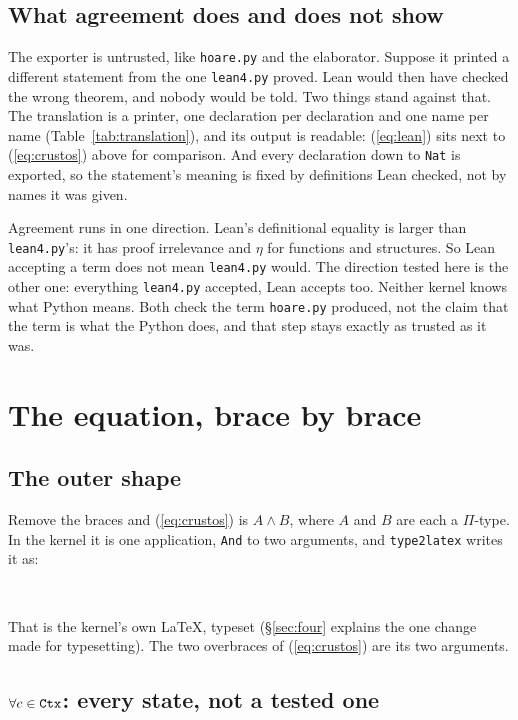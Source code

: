 \documentclass[11pt]{article}
\newcommand{\code}[1]{\texttt{#1}}
\begin{document}
\subsection{What agreement does and does not show}
\label{sec:agreement}

The exporter is untrusted, like \code{hoare.py} and the elaborator. Suppose
it printed a different statement from the one \code{lean4.py} proved. Lean
would then have checked the wrong theorem, and nobody would be told. Two
things stand against that. The translation is a printer, one declaration per
declaration and one name per name (Table~\ref{tab:translation}), and its
output is readable: (\ref{eq:lean}) sits next to (\ref{eq:crustos}) above for
comparison. And every declaration down to \code{Nat} is exported, so the
statement's meaning is fixed by definitions Lean checked, not by names it was
given.

Agreement runs in one direction. Lean's definitional equality is larger than
\code{lean4.py}'s: it has proof irrelevance and $\eta$ for functions and
structures. So Lean accepting a term does not mean \code{lean4.py} would. The
direction tested here is the other one: everything \code{lean4.py} accepted,
Lean accepts too. Neither kernel knows what Python means. Both check the term
\code{hoare.py} produced, not the claim that the term is what the Python does,
and that step stays exactly as trusted as it was.

\section{The equation, brace by brace}
\label{sec:braces}

\subsection{The outer shape}

Remove the braces and (\ref{eq:crustos}) is $A \wedge B$, where $A$ and $B$
are each a $\Pi$-type. In the kernel it is one application, \code{And} to two
arguments, and \code{type2latex} writes it as:

\medskip
{\tiny\noindent$$}
\medskip

That is the kernel's own \LaTeX{}, typeset (\S\ref{sec:four} explains the one
change made for typesetting). The two overbraces of (\ref{eq:crustos}) are its
two arguments.

\subsection{\texorpdfstring{$\forall c \in \ctx$}{forall c in Ctx}: every state, not a tested one}
\end{document}
